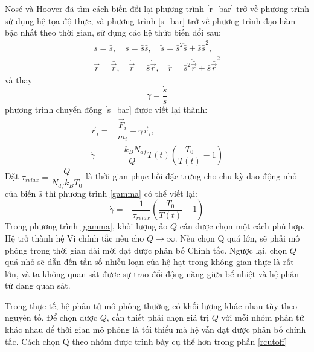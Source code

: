 \documentclass[12pt,a4paper,reqno, oneside]{book}
\begin{document}
			Nosé và Hoover đã tìm cách biến đổi lại phương trình \eqref{r_bar} trở về phương trình sử dụng hệ tọa độ thực, và phương trình \eqref{s_bar} trở về phương trình đạo hàm bậc nhất theo thời gian, sử dụng các hệ thức biến đổi sau:
			\begin{align}
			s = \bar{s},\quad \dot{s} = \bar{s}\dot{\bar{s}},\quad \ddot{s} = \bar{s}^2\ddot{\bar{s}}+\bar{s}\dot{\bar{s}}^2,\\
			\vec{r} = \bar{\vec{r}},\quad \dot{\vec{r}}=\bar{s}\dot{\vec{r}},\quad \ddot{r} = \bar{s}^{2}\ddot{\bar{\vec{r}}} + \bar{s}\dot{\bar{\vec{r}}}^{2}
			\end{align}
			và thay
			\begin{equation}
			\gamma = \dfrac{\dot{s}}{s}
			\end{equation}
			phương trình chuyển động \eqref{s_bar} được viết lại thành:
			\begin{align}
			\ddot{\vec{r}}_{i}= & \dfrac{\vec{F}_{i}}{m_{i}} - \gamma \vec{r}_{i},\\
			\dot{\gamma}= & \dfrac{-k_{B}N_{df}}{Q}T\left(t\right) \left( \dfrac{T_{0}}{T\left(t\right)}-1 \right)
			\label{gamma}
			\end{align}
			Đặt $\tau_{relax} = \dfrac{Q}{N_{df}k_{B}T_{0}}$ là thời gian phục hồi đặc trưng cho chu kỳ dao động nhỏ của biến $\bar{s}$ thì phương trình \eqref{gamma} có thể viết lại:
			\begin{equation}
			\dot{\gamma} = -\dfrac{1}{\tau_{relax}}\left( \dfrac{T_{0}}{T\left(t\right)}-1 \right)
			\end{equation}
			Trong phương trình \eqref{gamma}, khối lượng ảo $Q$ cần được chọn một cách phù hợp. Hệ trở thành hệ Vi chính tắc nếu cho $Q\rightarrow \infty$. Nếu chọn Q quá lớn, sẽ phải mô phỏng trong thời gian dài mới đạt được phân bố Chính tắc. Ngược lại, chọn $Q$ quá nhỏ sẽ dẫn đến tần số nhiễu loạn của hệ hạt trong không gian thực là rất lớn, và ta không quan sát được sự trao đổi động năng giữa bể nhiệt và hệ phân tử đang quan sát.
			
			Trong thực tế, hệ phân tử mô phỏng thường có khối lượng khác nhau tùy theo nguyên tố. Để chọn được $Q$, cần thiết phải chọn giá trị $Q$ với mỗi nhóm phân tử khác nhau để thời gian mô phỏng là tối thiểu mà hệ vẫn đạt được phân bố chính tắc. Cách chọn Q theo nhóm được trình bày cụ thể hơn trong phần \ref{rcutoff}
\end{document}
